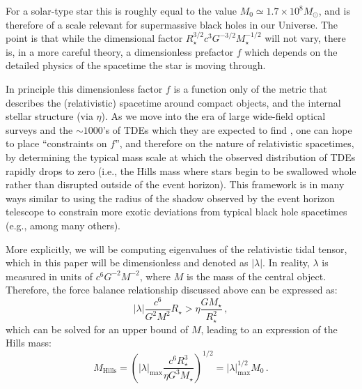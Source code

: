 \documentclass[
    reprint,
    prd,
    nofootinbib,
    amsmath,amssymb,
    aps,
    floatfix,
]{revtex4-2}
\begin{document}
For a solar-type star this is roughly equal to the value $M_{0} \simeq 1.7 \times 10^{8} M_\odot$, and is therefore of a scale relevant for supermassive black holes in our Universe. The point is that while the dimensional factor $R_{\star}^{3/2} c^{3} G^{-3/2} M_{\star}^{-1/2}$ will not vary, there is, in a more careful theory, a dimensionless prefactor $f$ which depends on the detailed physics of the spacetime the star is moving through. 

In principle this dimensionless factor $f$ is a function only of the metric that describes the (relativistic) spacetime around compact objects{, and the internal stellar structure (via $\eta$)}. As we move into the era of large wide-field optical surveys and the $\sim 1000$'s of TDEs which they are expected to find \cite{Bricman20}, one can hope to place ``constraints on $f$'', and therefore on the nature of relativistic spacetimes, by determining the typical mass scale at which the observed distribution of TDEs rapidly drops to zero (i.e., the Hills mass where stars begin to be swallowed whole rather than disrupted outside of the event horizon). This framework is in many ways similar to using the radius of the shadow observed by the event horizon telescope to constrain more exotic deviations from typical black hole spacetimes (e.g., \cite{EHT2021} among many others).

More explicitly, we will be computing eigenvalues of the relativistic tidal tensor, which in this paper will be dimensionless and denoted as $\left\lvert \lambda \right\rvert$. In reality, $\lambda$ is measured in units of $c^6 G^{-2} M^{-2}$, where $M$ is the mass of the central object. Therefore, the force balance relationship discussed above can be expressed as:
\begin{equation}
    \left\lvert \lambda \right\rvert \frac{c^{6}}{G^{2}M^{2}} R_{\star} > \eta \frac{GM_{\star}}{R_{\star}^{2}} \, ,
\end{equation}
which can be solved for an upper bound of $M$, leading to an expression of the Hills mass:
\begin{equation}
    M_{\text{Hills}} = \left( \left\lvert \lambda \right\rvert_{\text{max}} \frac{c^{6} R_{\star}^{3}}{\eta G^{3} M_{\star}} \right)^{1/2} = \left\lvert \lambda \right\rvert_{\text{max}}^{1/2} M_{0} \, .
    \label{eq:hills_mass}
\end{equation}
\end{document}
